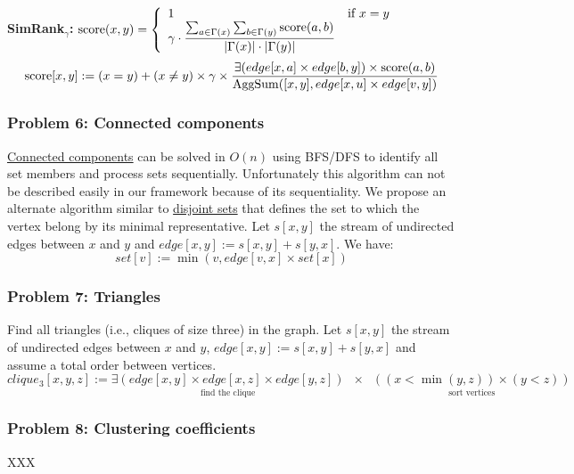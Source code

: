 \documentclass[11pt]{article}
\begin{document}
{\bf SimRank${}_\gamma$:} ${\rm score}(x,y)=\left\{\begin{array}{ll}1&\text{if }x=y\\
	\gamma\cdot\dfrac{\sum_{a\in\Gamma(x)}\sum_{b\in\Gamma(y)} {\rm score}(a,b)}
		{|\Gamma(x)| \cdot |\Gamma(y)|} \end{array}\right.$
\[{\rm score}[x,y] := (x=y) + (x\ne y) \times\gamma\times\dfrac
	{\exists(edge[x,a] \times edge[b,y]) \times {\rm score}(a,b)}
	{{\rm AggSum}([x,y], edge[x,u] \times edge[v,y])}\]

\subsubsection*{Problem 6: Connected components}
\href{http://en.wikipedia.org/wiki/Connected_component_(graph_theory)}{Connected components} can be solved in $O(n)$ using BFS/DFS to identify all set members and process sets sequentially. Unfortunately this algorithm can not be described easily in our framework because of its sequentiality. We propose an alternate algorithm similar to \href{http://en.wikipedia.org/wiki/Disjoint-set_data_structure}{disjoint sets} that defines the set to which the vertex belong by its minimal representative. Let $s[x,y]$ the stream of undirected edges between $x$ and $y$ and $edge[x,y] := s[x,y]+s[y,x]$. We have:
\[set[v] := \min(v, edge[v,x] \times set[x])\]

\subsubsection*{Problem 7: Triangles}
Find all triangles (i.e., cliques of size three) in the graph. Let $s[x,y]$ the stream of undirected edges between $x$ and $y$, $edge[x,y] := s[x,y]+s[y,x]$ and assume a total order between vertices.
\[clique_3[x,y,z] := \underset{\text{find the clique}}{\exists(edge[x,y] \times edge[x,z] \times edge[y,z])}
	\;\;\times\;\; \underset{\text{sort vertices}}{((x< \min(y,z)) \times (y < z))}\]

\subsubsection*{Problem 8: Clustering coefficients}
XXX
\end{document}
